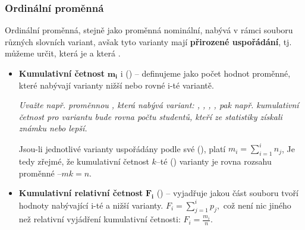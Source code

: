 \subsubsection{Ordinální proměnná}
Ordinální proměnná, stejně jako proměnná nominální, nabývá v rámci souboru různých slovních variant, avšak tyto varianty mají \textbf{přirozené uspořádání}, tj. můžeme určit, která je  a která . 
\begin{itemize}
	\item \textbf{Kumulativní četnost} $\mathbf{m_i}$ i () -- definujeme jako počet hodnot proměnné, které nabývají varianty nižší nebo rovné i-té variantě. 
	
	\textit{Uvažte např. proměnnou , která nabývá variant: , , , , pak např. kumulativní četnost pro variantu  bude rovna počtu studentů, kteří ze statistiky získali známku  nebo lepší.}
	
	Jsou-li jednotlivé varianty uspořádány podle své (), platí $m_i = \sum\limits_{i=1}^i n_j$, Je tedy zřejmé, že kumulativní četnost $k$--té () varianty je rovna rozsahu proměnné $– mk = n$.

	\item \textbf{Kumulativní relativní četnost} $\mathbf{F_i}$ () -- vyjadřuje jakou část souboru tvoří hodnoty nabývající i-té a nižší varianty. $F_i = \sum\limits_{j=1}^i p_j,$ což není nic jiného než relativní vyjádření kumulativní četnosti: $F_i = \frac{m_i}{n}$.
	

\end{itemize}
